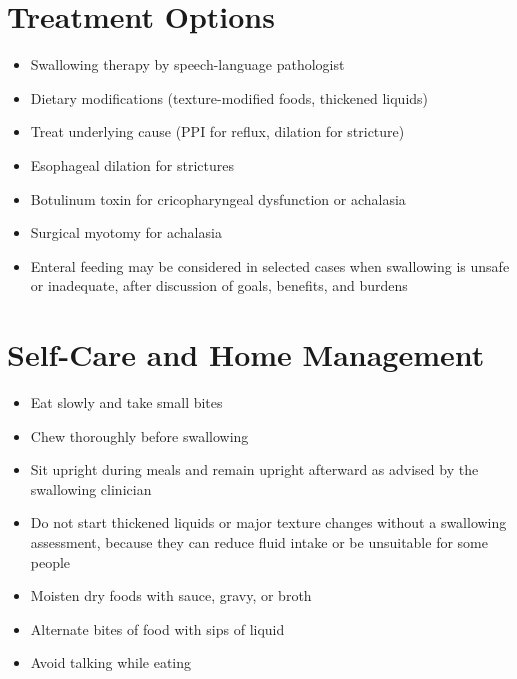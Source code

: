 \section*{Treatment Options}
\begin{itemize}
\item Swallowing therapy by speech-language pathologist
\item Dietary modifications (texture-modified foods, thickened liquids)
\item Treat underlying cause (PPI for reflux, dilation for stricture)
\item Esophageal dilation for strictures
\item Botulinum toxin for cricopharyngeal dysfunction or achalasia
\item Surgical myotomy for achalasia
\item Enteral feeding may be considered in selected cases when swallowing is unsafe or inadequate, after discussion of goals, benefits, and burdens
\end{itemize}

\section*{Self-Care and Home Management}
\begin{itemize}
\item Eat slowly and take small bites
\item Chew thoroughly before swallowing
\item Sit upright during meals and remain upright afterward as advised by the swallowing clinician
\item Do not start thickened liquids or major texture changes without a swallowing assessment, because they can reduce fluid intake or be unsuitable for some people
\item Moisten dry foods with sauce, gravy, or broth
\item Alternate bites of food with sips of liquid
\item Avoid talking while eating
\end{itemize}

